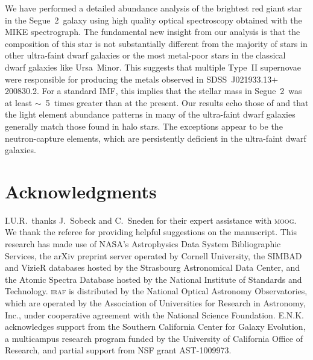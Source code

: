 \documentclass[useAMS,usenatbib,usegraphicx]{mn2e}
\def\seg{\mbox{SDSS~J021933.13$+$200830.2}}
\def\seggal{\mbox{Segue~2}}
\def\umigal{\mbox{Ursa Minor}}
\begin{document}
We have performed a detailed abundance analysis of
the brightest red giant star in the \seggal\ galaxy
using high quality optical spectroscopy obtained
with the MIKE spectrograph.
The fundamental new insight from our analysis is that the
composition of this star is not substantially
different from the majority of stars in
other ultra-faint dwarf galaxies or the most metal-poor stars
in the classical dwarf galaxies like \umigal.
This suggests that multiple
Type~II supernovae were responsible for producing the 
metals observed in \seg.
For a standard \citet{salpeter55} IMF,
this implies that the stellar mass in \seggal\ 
was at least $\sim$~5~times greater than at the present.
Our results echo those of \citet{frebel10} and \citet{simon10}
that the light element abundance patterns in many of 
the ultra-faint dwarf galaxies
generally match those found in halo stars.
The exceptions appear to be the
neutron-capture elements, which are persistently 
deficient in the ultra-faint dwarf galaxies.


\section*{Acknowledgments}


I.U.R.\ thanks J.\ Sobeck and C.\ Sneden
for their expert assistance with \textsc{moog}.
We thank the referee for providing helpful suggestions on the manuscript.
This research has made use of NASA's 
Astrophysics Data System Bibliographic Services, 
the arXiv preprint server operated by Cornell University, 
the SIMBAD and VizieR databases hosted by the
Strasbourg Astronomical Data Center, and 
the Atomic Spectra Database \citep{kramida13} hosted by
the National Institute of Standards and Technology. 
\textsc{iraf} is distributed by the National Optical Astronomy Observatories,
which are operated by the Association of Universities for Research
in Astronomy, Inc., under cooperative agreement with the National
Science Foundation.
E.N.K. acknowledges support from the Southern California Center for
Galaxy Evolution, a multicampus research program funded by the
University of California Office of Research, and partial support from
NSF grant AST-1009973.


\end{document}
